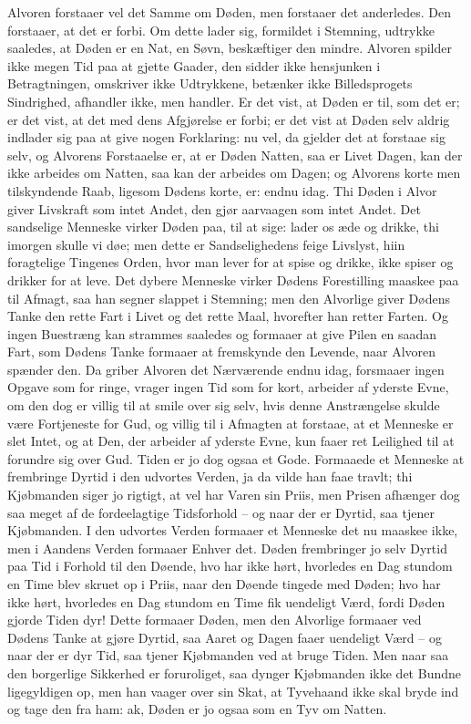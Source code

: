 \documentclass[12pt,a4paper]{article}
\begin{document}
Alvoren forstaaer vel det Samme om Døden, men forstaaer det anderledes. Den forstaaer, at det er forbi. Om dette lader sig, formildet i Stemning, udtrykke saaledes, at Døden er en Nat, en Søvn, beskæftiger den mindre. Alvoren spilder ikke megen Tid paa at gjette Gaader, den sidder ikke hensjunken i Betragtningen, omskriver ikke Udtrykkene, betænker ikke Billedsprogets Sindrighed, afhandler ikke, men handler. Er det vist, at Døden er til, som det er; er det vist, at det med dens Afgjørelse er forbi; er det vist at Døden selv aldrig indlader sig paa at give nogen Forklaring: nu vel, da gjelder det at forstaae sig selv, og Alvorens Forstaaelse er, at er Døden Natten, saa er Livet Dagen, kan der ikke arbeides om Natten, saa kan der arbeides om Dagen; og Alvorens korte men tilskyndende Raab, ligesom Dødens korte, er: endnu idag. Thi Døden i Alvor giver Livskraft som intet Andet, den gjør aarvaagen som intet Andet. Det sandselige Menneske virker Døden paa, til at sige: lader os æde og drikke, thi imorgen skulle vi døe; men dette er Sandselighedens feige Livslyst, hiin foragtelige Tingenes Orden, hvor man lever for at spise og drikke, ikke spiser og drikker for at leve. Det dybere Menneske virker Dødens Forestilling maaskee paa til Afmagt, saa han segner slappet i Stemning; men den Alvorlige giver Dødens Tanke den rette Fart i Livet og det rette Maal, hvorefter han retter Farten. Og ingen Buestræng kan strammes saaledes og formaaer at give Pilen en saadan Fart, som Dødens Tanke formaaer at fremskynde den Levende, naar Alvoren spænder den. Da griber Alvoren det Nærværende endnu idag, forsmaaer ingen Opgave som for ringe, vrager ingen Tid som for kort, arbeider af yderste Evne, om den dog er villig til at smile over sig selv, hvis denne Anstrængelse skulde være Fortjeneste for Gud, og villig til i Afmagten at forstaae, at et Menneske er slet Intet, og at Den, der arbeider af yderste Evne, kun faaer ret Leilighed til at forundre sig over Gud. Tiden er jo dog ogsaa et Gode. Formaaede et Menneske at frembringe Dyrtid i den udvortes Verden, ja da vilde han faae travlt; thi Kjøbmanden siger jo rigtigt, at vel har Varen sin Priis, men Prisen afhænger dog saa meget af de fordeelagtige Tidsforhold – og naar der er Dyrtid, saa tjener Kjøbmanden. I den udvortes Verden formaaer et Menneske det nu maaskee ikke, men i Aandens Verden formaaer Enhver det. Døden frembringer jo selv Dyrtid paa Tid i Forhold til den Døende, hvo har ikke hørt, hvorledes en Dag stundom en Time blev skruet op i Priis, naar den Døende tingede med Døden; hvo har ikke hørt, hvorledes en Dag stundom en Time fik uendeligt Værd, fordi Døden gjorde Tiden dyr! Dette formaaer Døden, men den Alvorlige formaaer ved Dødens Tanke at gjøre Dyrtid, saa Aaret og Dagen faaer uendeligt Værd – og naar der er dyr Tid, saa tjener Kjøbmanden ved at bruge Tiden. Men naar saa den borgerlige Sikkerhed er foruroliget, saa dynger Kjøbmanden ikke det Bundne ligegyldigen op, men han vaager over sin Skat, at Tyvehaand ikke skal bryde ind og tage den fra ham: ak, Døden er jo ogsaa som en Tyv om Natten.
\end{document}
